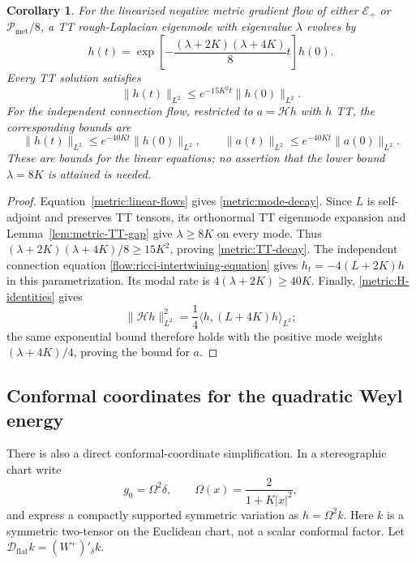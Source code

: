 \documentclass[11pt]{article}
\numberwithin{equation}{section}
\newtheorem{corollary}[theorem]{Corollary}
\theoremstyle{definition}
\theoremstyle{remark}
\begin{document}
\begin{corollary}\label{cor:metric-linear-decay}
For the linearized negative metric gradient flow of either
$\mathcal E_+$ or $\mathcal P_{\mathrm{met}}/8$, a TT rough-Laplacian
eigenmode with eigenvalue $\lambda$ evolves by
\begin{equation}\label{metric:mode-decay}
 h(t)=\exp\!\left[-\frac{(\lambda+2K)(\lambda+4K)}8t\right]h(0).
\end{equation}
Every TT solution satisfies
\begin{equation}\label{metric:TT-decay}
 \|h(t)\|_{L^2}\leq e^{-15K^2t}\|h(0)\|_{L^2}.
\end{equation}
For the independent connection flow, restricted to $a=\mathcal Hh$
with $h$ TT, the corresponding bounds are
\begin{equation}\label{metric:connection-TT-decay}
 \|h(t)\|_{L^2}\leq e^{-40Kt}\|h(0)\|_{L^2},\qquad
 \|a(t)\|_{L^2}\leq e^{-40Kt}\|a(0)\|_{L^2}.
\end{equation}
These are bounds for the linear equations; no assertion that the lower
bound $\lambda=8K$ is attained is needed.
\end{corollary}

\begin{proof}
Equation~\eqref{metric:linear-flows} gives
\eqref{metric:mode-decay}. Since $L$ is self-adjoint and preserves TT
tensors, its orthonormal TT eigenmode expansion and
Lemma~\ref{lem:metric-TT-gap} give $\lambda\geq8K$ on every mode.
Thus $(\lambda+2K)(\lambda+4K)/8\geq15K^2$, proving
\eqref{metric:TT-decay}. The independent connection equation
\eqref{flow:ricci-intertwining-equation} gives
$h_t=-4(L+2K)h$ in this parametrization. Its modal rate is
$4(\lambda+2K)\geq40K$. Finally,
\eqref{metric:H-identities} gives
\[
 \|\mathcal Hh\|_{L^2}^2
 =\frac14\langle h,(L+4K)h\rangle_{L^2};
\]
the same exponential bound therefore holds with the positive mode
weights $(\lambda+4K)/4$, proving the bound for $a$.
\end{proof}

\subsection{Conformal coordinates for the quadratic Weyl energy}
\label{subsec:metric-stereographic}

There is also a direct conformal-coordinate simplification. In a
stereographic chart write
\[
 g_0=\Omega^2\delta,\qquad
 \Omega(x)=\frac{2}{1+K|x|^2},
\]
and express a compactly supported symmetric variation as
$h=\Omega^2 k$. Here $k$ is a symmetric two-tensor on the Euclidean
chart, not a scalar conformal factor. Let
$\mathcal D_{\mathrm{flat}}k=(W^+)'_\delta k$.
\end{document}
